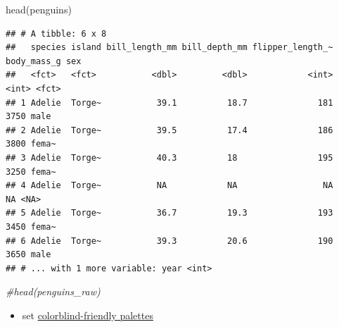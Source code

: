 \documentclass[
]{book}
\newenvironment{Shaded}{\begin{snugshade}}{\end{snugshade}}
\newcommand{\CommentTok}[1]{\textcolor[rgb]{0.56,0.35,0.01}{\textit{#1}}}
\newcommand{\FunctionTok}[1]{\textcolor[rgb]{0.00,0.00,0.00}{#1}}
\newcommand{\NormalTok}[1]{#1}
\providecommand{\tightlist}{%
  \setlength{\itemsep}{0pt}\setlength{\parskip}{0pt}}
\begin{document}
\begin{Shaded}
\begin{Highlighting}[]
\FunctionTok{head}\NormalTok{(penguins)}
\end{Highlighting}
\end{Shaded}

\begin{verbatim}
## # A tibble: 6 x 8
##   species island bill_length_mm bill_depth_mm flipper_length_~ body_mass_g sex  
##   <fct>   <fct>           <dbl>         <dbl>            <int>       <int> <fct>
## 1 Adelie  Torge~           39.1          18.7              181        3750 male 
## 2 Adelie  Torge~           39.5          17.4              186        3800 fema~
## 3 Adelie  Torge~           40.3          18                195        3250 fema~
## 4 Adelie  Torge~           NA            NA                 NA          NA <NA> 
## 5 Adelie  Torge~           36.7          19.3              193        3450 fema~
## 6 Adelie  Torge~           39.3          20.6              190        3650 male 
## # ... with 1 more variable: year <int>
\end{verbatim}

\begin{Shaded}
\begin{Highlighting}[]
\CommentTok{\#head(penguins\_raw)}
\end{Highlighting}
\end{Shaded}

\begin{itemize}
\tightlist
\item
  set \href{https://jfly.uni-koeln.de/color/}{colorblind-friendly palettes}
\end{itemize}
\end{document}
